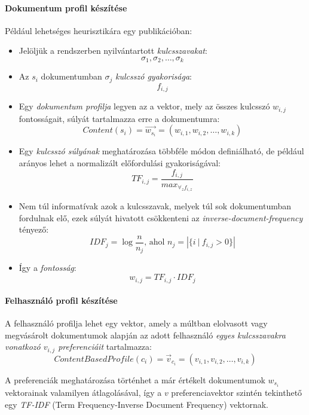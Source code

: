 \documentclass[
]{thesis-ekf}
\theoremstyle{definition}
\theoremstyle{remark}
\begin{document}
\paragraph{Dokumentum profil készítése}
\label{p-dokumentum-profil}
Például lehetséges heurisztikára egy publikációban:
\begin{itemize}
	\item Jelöljük a rendszerben nyilvántartott \emph{kulcsszavakat}:
	\[\sigma_{1}, \sigma_{2}, \dots, \sigma_{k}\]
	
	\item Az $s_{i}$ dokumentumban $\sigma_{j}$ \emph{kulcsszó gyakorisága}:
	\[f_{i,j}\]
	
	\item Egy \emph{dokumentum profilja} legyen az a vektor, mely az összes kulcsszó $w_{i,j}$ fontosságait, súlyát tartalmazza erre a dokumentumra:
	\[Content(s_{i})=\vec{w_{s_{i}}}=(w_{i,1},w_{i,2},\dots,w_{i,k})\]
	
	\item Egy \emph{kulcsszó súlyának} meghatározása többféle módon definiálható, de például arányos lehet a normalizált előfordulási gyakoriságával:
	\[TF_{i,j}=\frac{f_{i,j}}{max_{\forall_{z}f_{i,z}}}\]
	
	\item Nem túl informatívak azok a kulcsszavak, melyek túl sok dokumentumban fordulnak elő, ezek súlyát hivatott csökkenteni az \emph{inverse-document-frequency} tényező:
	\[ IDF_{j}=\log{\frac{n}{n_{j}}} \text{, ahol }n_{j}=\left |\{i~|~f_{i,j}>0\} \right | \]
	
	\item Így a \emph{fontosság}:
	\[ w_{i,j}=TF_{i,j}\cdot IDF_{j} \]
\end{itemize}
\cite{werner-ajanlo-rendszer}

\paragraph{Felhasználó profil készítése}
A felhasználó profilja lehet egy vektor, amely a múltban elolvasott vagy megvásárolt dokumentumok alapján az adott felhasználó \emph{egyes kulcsszavakra vonatkozó $v_{i,j}$ preferenciáit} tartalmazza: 
	\[ContentBasedProfile(c_{i})=\vec{v}_{c_{i}}=(v_{i,1}, v_{i,2}, \dots, v_{i,k})\]
	
A preferenciák meghatározása történhet a már értékelt dokumentumok ${w}_{s_{i}}$ vektorainak valamilyen átlagolásával, így a ${v}$ preferenciavektor szintén tekinthető egy \emph{TF-IDF} (Term Frequency-Inverse Document Frequency) vektornak.\cite{werner-ajanlo-rendszer}
\end{document}

